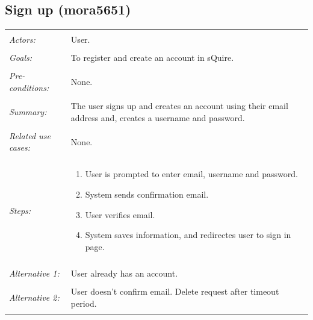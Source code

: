\documentclass[11pt]{report}
\begin{document}
\subsection{Sign up (mora5651)}
\begin{tabular}{ p{2cm} p{12cm} }
 \hline
 \\
 \textit{Actors:} & User. \\ 
 \\
 \textit{Goals:} & To register and create an account in sQuire. \\
 \\
 \textit{Pre-conditions:} & None. \\
 \\
 \textit{Summary:} & The user signs up and creates an account using their email address and, creates a username and password. \\ 
 \\
 \textit{Related use cases:} & None. \\ 
 \\
 \textit{Steps:} & \begin{enumerate}
  \item User is prompted to enter email, username and password. 
  \item System sends confirmation email. 
  \item User verifies email. 
  \item System saves information, and redirectes user to sign in page. 
 \end{enumerate} \\
 \\
 \textit{Alternative 1:} & User already has an account. \\ 
 \\
 \textit{Alternative 2:} & User doesn't confirm email. Delete request after timeout period. \\
 \\
\hline
\end{tabular}
\end{document}
